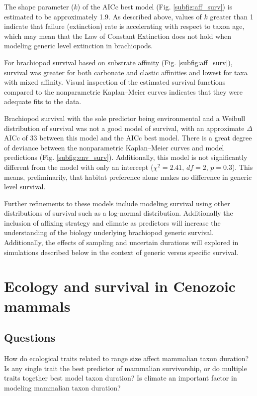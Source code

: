 \documentclass[12pt,letterpaper]{article}
\begin{document}
The shape parameter (\(k\)) of the AICc best model (Fig. \ref{subfig:aff_surv}) is estimated to be approximately 1.9. As described above, values of \(k\) greater than 1 indicate that failure (extinction) rate is accelerating with respect to taxon age, which may mean that the Law of Constant Extinction does not hold when modeling generic level extinction in brachiopods.

For brachiopod survival based on substrate affinity (Fig. \ref{subfig:aff_surv}), survival was greater for both carbonate and clastic affinities and lowest for taxa with mixed affinity. Visual inspection of the estimated survival functions compared to the nonparametric Kaplan--Meier curves indicates that they were adequate fits to the data. 

Brachiopod survival with the sole predictor being environmental and a Weibull distribution of survival was not a good model of survival, with an approximate \(\Delta\)AICc of 33 between this model and the AICc best model. There is a great degree of deviance between the nonparametric Kaplan--Meier curves and model predictions (Fig. \ref{subfig:env_surv}). Additionally, this model is not significantly different from the model with only an intercept (\(\chi^{2} = 2.41\), \(df = 2\), \(p = 0.3\)). This means, preliminarily, that habitat preference alone makes no difference in generic level survival.

Further refinements to these models include modeling survival using other distributions of survival such as a log-normal distribution. Additionally the inclusion of affixing strategy and climate as predictors will increase the understanding of the biology underlying brachiopod generic survival. Additionally, the effects of sampling and uncertain durations will explored in simulations described below in the context of generic versus specific survival.




\section{Ecology and survival in Cenozoic mammals} \label{sec:mamsurv}

\subsection{Questions} \label{sec:mamsurvques}
How do ecological traits related to range size affect mammalian taxon duration? Is any single trait the best predictor of mammalian survivorship, or do multiple traits together best model taxon duration? Is climate an important factor in modeling mammalian taxon duration?
\end{document}
